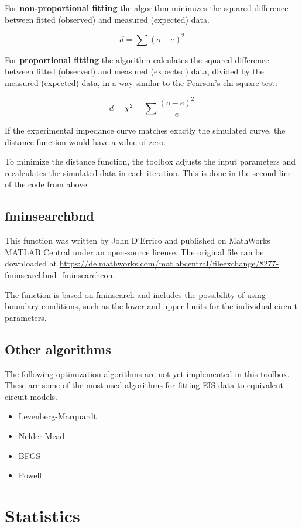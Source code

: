 \documentclass[10pt,a4paper,oneside]{book}
\begin{document}
For \textbf{non-proportional fitting} the algorithm minimizes the squared difference between fitted (observed) and measured (expected) data.

\[ d = \sum(o-e)^2 \]

For \textbf{proportional fitting} the algorithm calculates the squared difference between fitted (observed) and measured (expected) data, divided by the measured (expected) data, in a way similar to the Pearson's chi-square test:

\[ d = \chi^2 = \sum \dfrac{(o-e)^2}{e} \]

If the experimental impedance curve matches exactly the simulated curve, the distance function would have a value of zero.

To minimize the distance function, the toolbox adjusts the input parameters and recalculates the simulated data in each iteration. This is done in the second line of the code from above.

\section{fminsearchbnd}

This function was written by John D'Errico and published on MathWorks MATLAB Central under an open-source license. The original file can be downloaded at \url{https://de.mathworks.com/matlabcentral/fileexchange/8277-fminsearchbnd--fminsearchcon}.

The function is based on fminsearch and includes the possibility of using boundary conditions, such as the lower and upper limits for the individual circuit parameters.

\section{Other algorithms}

The following optimization algorithms are not yet implemented in this toolbox. These are some of the most used algorithms for fitting EIS data to equivalent circuit models.

\begin{itemize}
	\item Levenberg-Marquardt
	\item Nelder-Mead
	\item BFGS
	\item Powell
\end{itemize}



\chapter{Statistics}
\end{document}
